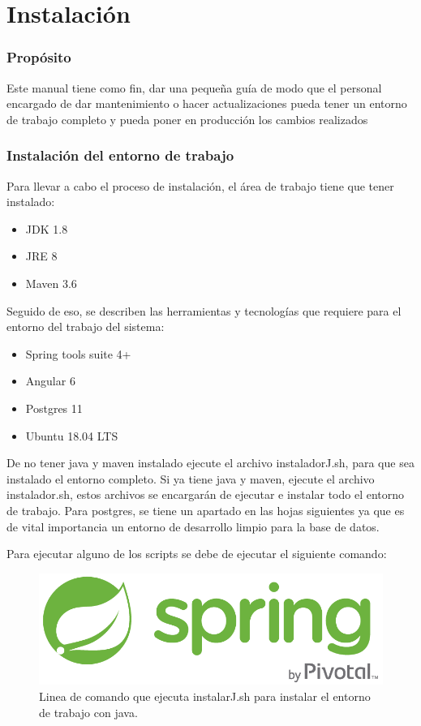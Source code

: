 \chapter{Instalación}

\subsection{Propósito}
Este manual tiene como fin, dar una pequeña guía de modo que el personal encargado de dar mantenimiento o hacer actualizaciones pueda tener un entorno de trabajo completo y pueda poner en producción los cambios realizados

\subsection{Instalación del entorno de trabajo}
Para llevar a cabo el proceso de instalación, el área de trabajo tiene que tener instalado:
\begin{itemize}
  \item JDK 1.8
  \item JRE 8
  \item Maven 3.6  
\end{itemize}

Seguido de eso, se describen las herramientas y tecnologías que requiere para el entorno del trabajo del sistema:
\begin{itemize}
	\item Spring tools suite 4+
  \item Angular 6
  \item Postgres 11
  \item Ubuntu 18.04 LTS
\end{itemize}
De no tener java y maven instalado ejecute el archivo instaladorJ.sh, para que sea instalado el entorno completo.
Si ya tiene java y maven, ejecute el archivo instalador.sh, estos archivos se encargarán de ejecutar e instalar todo el entorno de trabajo.
Para postgres, se tiene un apartado en las hojas siguientes ya que es de vital importancia un entorno de desarrollo limpio para la base de datos.

Para ejecutar alguno de los scripts se debe de ejecutar el siguiente comando:


\begin{figure}[!h]
  \centering
  \includegraphics[width=0.1\linewidth]{images/tecnologias/spring.png}
  \caption{Linea de comando que ejecuta instalarJ.sh para instalar el entorno de trabajo con java.}
\end{figure}

